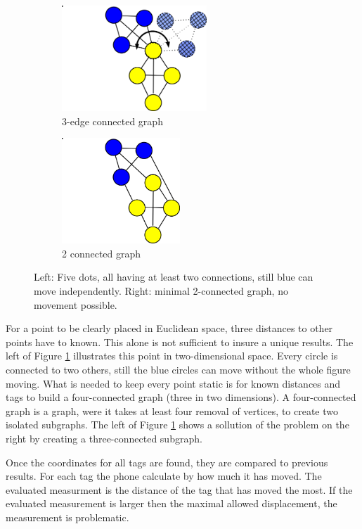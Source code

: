 \begin{figure}[ht!]
	\begin{subfigure}{.4\linewidth}
		\centering
		\includegraphics[height=150px]{graphics/schematics/connected_dots.png}
		\caption{3-edge connected graph}
	\end{subfigure}
\hspace{1cm}
	\begin{subfigure}{.4\linewidth}
		\centering
		\includegraphics[height=150px]{graphics/schematics/connected_dots_k_connected.png}
		\caption{2 connected graph}
	\end{subfigure}
	\caption{ Left: Five dots, all having at least two connections, still blue can move independently. Right: minimal 2-connected graph, no movement possible. }
	\label{f:connected_dots}
\end{figure}

For a point to be clearly placed in Euclidean space, three distances to other points have to known.
This alone is not sufficient to insure a unique results.
The left of Figure \ref{f:connected_dots} illustrates this point in two-dimensional space.
Every circle is connected to two others, still the blue circles can move without the whole figure moving.
What is needed to keep every point static is for known distances and tags to build a four-connected graph (three in two dimensions).
A four-connected graph is a graph, were it takes at least four removal of vertices, to create two isolated subgraphs.
The left of Figure \ref{f:connected_dots} shows a sollution of the problem on the right by creating a three-connected subgraph.

Once the coordinates for all tags are found, they are compared to previous results.
For each tag the phone calculate by how much it has moved.
The evaluated measurment is the distance of the tag that has moved the most.
If the evaluated measurement is larger then the maximal allowed displacement, the measurement is problematic.



